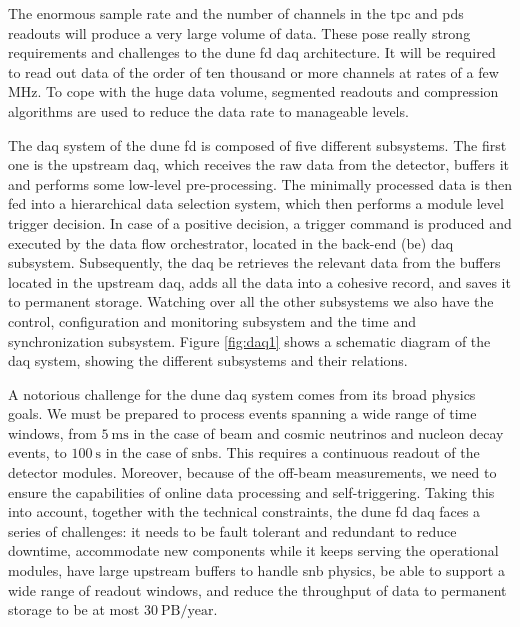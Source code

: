 The enormous sample rate and the number of channels in the \gls{tpc} and \gls{pds} readouts will produce a very large volume of data. These pose really strong requirements and challenges to the \gls{dune} \gls{fd} \gls{daq} architecture. It will be required to read out data of the order of ten thousand or more channels at rates of a few MHz. To cope with the huge data volume, segmented readouts and compression algorithms are used to reduce the data rate to manageable levels.

The \gls{daq} system of the \gls{dune} \gls{fd} is composed of five different subsystems. The first one is the upstream \gls{daq}, which receives the raw data from the detector, buffers it and performs some low-level pre-processing. The minimally processed data is then fed into a hierarchical data selection system, which then performs a module level trigger decision. In case of a positive decision, a trigger command is produced and executed by the data flow orchestrator, located in the back-end (\gls{be}) \gls{daq} subsystem. Subsequently, the \gls{daq} \gls{be} retrieves the relevant data from the buffers located in the upstream \gls{daq}, adds all the data into a cohesive record, and saves it to permanent storage. Watching over all the other subsystems we also have the control, configuration and monitoring subsystem and the time and synchronization subsystem. Figure \ref{fig:daq1} shows a schematic diagram of the \gls{daq} system, showing the different subsystems and their relations.

A notorious challenge for the \gls{dune} \gls{daq} system comes from its broad physics goals. We must be prepared to process events spanning a wide range of time windows, from $5 \ \mathrm{ms}$ in the case of beam and cosmic neutrinos and nucleon decay events, to $100 \ \mathrm{s}$ in the case of \gls{snb}s. This requires a continuous readout of the detector modules. Moreover, because of the off-beam measurements, we need to ensure the capabilities of online data processing and self-triggering. Taking this into account, together with the technical constraints, the \gls{dune} \gls{fd} \gls{daq} faces a series of challenges: it needs to be fault tolerant and redundant to reduce downtime, accommodate new components while it keeps serving the operational modules, have large upstream buffers to handle \gls{snb} physics, be able to support a wide range of readout windows, and reduce the throughput of data to permanent storage to be at most $30 \ \mathrm{PB/year}$.